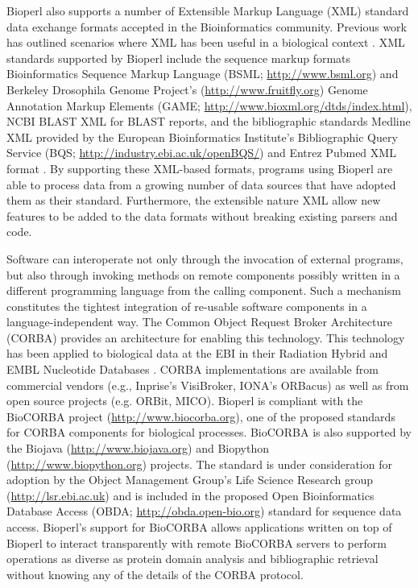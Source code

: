 \documentclass[12pt]{article}
\begin{document}
Bioperl also supports a number of Extensible Markup Language (XML)
standard data exchange formats accepted in the Bioinformatics
community.  Previous work has outlined scenarios where XML has been
useful in a biological context \cite{xmlbioinformatics}.  XML
standards supported by Bioperl include the sequence markup formats
Bioinformatics Sequence Markup Language (BSML;
\url{http://www.bsml.org}) and Berkeley Drosophila Genome Project's
(\url{http://www.fruitfly.org}) Genome Annotation Markup Elements
(GAME; \url{http://www.bioxml.org/dtds/index.html}), NCBI BLAST XML
for BLAST reports, and the bibliographic standards Medline XML
provided by the European Bioinformatics Institute's Bibliographic
Query Service (BQS; \url{http://industry.ebi.ac.uk/openBQS/}) and
Entrez Pubmed XML format \cite{entrez}.  By supporting these XML-based
formats, programs using Bioperl are able to process data from a
growing number of data sources that have adopted them as their standard.
Furthermore, the extensible nature XML allow new features to be added
to the data formats without breaking existing parsers and code.

Software can interoperate not only through the invocation of external
programs, but also through invoking methods on remote components
possibly written in a different programming language from the calling
component.  Such a mechanism constitutes the tightest integration of
re-usable software components in a language-independent way.  The
Common Object Request Broker Architecture (CORBA) \cite{corba}
provides an architecture for enabling this technology.  This
technology has been applied to biological data at the EBI in their
Radiation Hybrid \cite{rhdb} and EMBL Nucleotide Databases
\cite{embl-corba}.  CORBA implementations are available from
commercial vendors (e.g., Inprise's VisiBroker, IONA's ORBacus) as
well as from open source projects (e.g. ORBit, MICO).  Bioperl is
compliant with the BioCORBA project (\url{http://www.biocorba.org}),
one of the proposed standards for CORBA components for biological
processes.  BioCORBA is also supported by the Biojava
(\url{http://www.biojava.org}) and Biopython
(\url{http://www.biopython.org}) projects.  The standard is under
consideration for adoption by the Object Management Group's Life
Science Research group (\url{http://lsr.ebi.ac.uk}) and is included in
the proposed Open Bioinformatics Database Access (OBDA;
\url{http://obda.open-bio.org}) standard for sequence data access.
Bioperl's support for BioCORBA allows applications written on top of
Bioperl to interact transparently with remote BioCORBA servers to
perform operations as diverse as protein domain analysis and
bibliographic retrieval without knowing any of the details of the
CORBA protocol.
\end{document}
